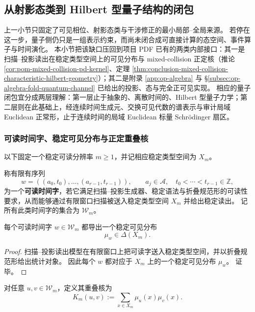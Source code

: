 \subsection{从射影态类到 Hilbert 型量子结构的闭包}\label{subsec:cdim-hilbert-quantum-closure}
上一小节只固定了可见相位、射影态类与干涉修正的最小局部--全局来源。
若停在这一步，量子侧仍只是一组表示约束，而尚未闭合成可直接计算的态空间、事件算子与时间演化。
本小节把该缺口压回到项目 PDF 已有的两类内部接口：其一是扫描--投影读出在稳定类型空间上的可见分布与 mixed-collision 正定核（推论 \ref{cor:pom-mixed-collision-pd-kernel}、定理 \ref{thm:conclusion-mixed-collision-characteristic-hilbert-geometry}）；其二是附录 \ref{app:op-algebra} 与 \S\ref{subsec:op-algebra-fold-quantum-channel} 已给出的投影、态与完全正可见实现。
相应的量子闭包宜分成两层理解：第一层止于抽象的、离散时间的、Hilbert 型量子力学；第二层则在此基础上，经连续时间生成元、交换可见代数的谱表示与审计局域 Euclidean 正常形，止于连续时间的局域 Euclidean 标量 Schr\"odinger 扇区。

\subsubsection{可读时间字、稳定可见分布与正定重叠核}
以下固定一个稳定可读分辨率 \(m\ge 1\)，并记相应稳定类型空间为 \(X_m\)。

\begin{definition}[可读时间字]\label{def:cdim-readable-time-word}
称有限有序列
\[
w=((a_0,t_0),\dots,(a_{r-1},t_{r-1})),
\qquad
a_j\in\mathcal A,\quad t_0<\cdots<t_{r-1}\in\mathbb Z,
\]
为一个\textbf{可读时间字}，若它满足扫描--投影生成器、稳定语法与折叠规范形的可读性要求，从而能够通过有限窗口扫描被送入稳定类型空间 \(X_m\) 并给出稳定读出。
记所有此类时间字的集合为 \(\mathcal W_m\)。
\end{definition}

\begin{proposition}[可读时间字导出稳定可见分布]\label{prop:cdim-readable-time-word-visible-distribution}
每个可读时间字 \(w\in\mathcal W_m\) 都导出一个稳定可见分布
\[
\mu_w\in\Delta(X_m).
\]
\end{proposition}
\begin{proof}
扫描--投影读出模型在有限窗口上把可读字送入稳定类型空间，并以折叠规范形给出统计对象。
因此每个 \(w\) 都对应于 \(X_m\) 上的一个稳定可见分布 \(\mu_w\)。
证毕。
\end{proof}

\begin{definition}[重叠核]\label{def:cdim-readable-time-word-overlap-kernel}
对任意 \(u,v\in\mathcal W_m\)，定义其重叠核为
\[
K_m(u,v):=\sum_{x\in X_m}\mu_u(x)\mu_v(x).
\]
\end{definition}

